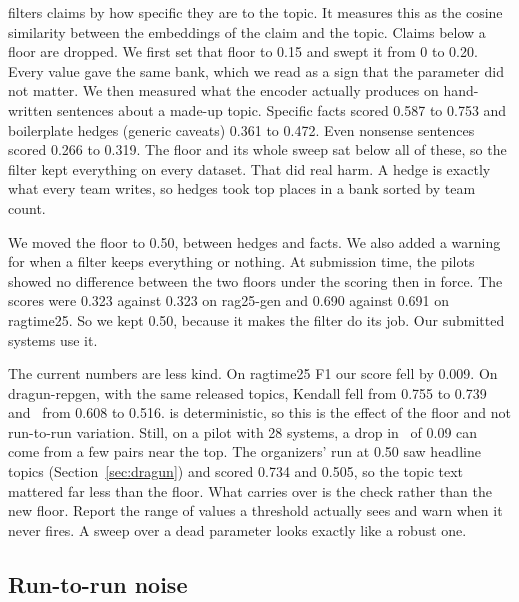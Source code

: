  filters claims by how specific they are to the topic. It
measures this as the cosine similarity between the embeddings of the claim and the
topic. Claims below a floor are dropped. We first set that floor to 0.15 and swept
it from 0 to 0.20. Every value gave the same bank, which we read as a sign that the
parameter did not matter. We then measured what the encoder actually produces on
hand-written sentences about a made-up topic. Specific facts scored 0.587 to 0.753
and boilerplate hedges (generic caveats) 0.361 to 0.472. Even nonsense sentences
scored 0.266 to 0.319. The floor and its whole sweep sat below all of these, so the
filter kept everything on every dataset. That did real harm. A hedge is exactly
what every team writes, so hedges took top places in a bank sorted by team count.

We moved the floor to 0.50, between hedges and facts. We also added a warning for
when a filter keeps everything or nothing. At submission time, the pilots showed no
difference between the two floors under the scoring then in force. The scores were
0.323 against 0.323 on rag25-gen and 0.690 against 0.691 on ragtime25. So we kept
0.50, because it makes the filter do its job. Our submitted 
systems use it.

The current numbers are less kind. On ragtime25 F1 our score fell by 0.009. On
dragun-repgen, with the same released topics, Kendall fell from 0.755 to 0.739 and
\tauap\ from 0.608 to 0.516.  is deterministic, so this is the
effect of the floor and not run-to-run variation. Still, on a pilot with 28
systems, a drop in \tauap\ of 0.09 can come from a few pairs near the top. The
organizers' run at 0.50 saw headline topics (Section~\ref{sec:dragun}) and scored
0.734 and 0.505, so the topic text mattered far less than the floor. What carries
over is the check rather than the new floor. Report the range of values a
threshold actually sees and warn when it never fires. A sweep over a dead
parameter looks exactly like a robust one.

\subsection{Run-to-run noise}
\label{sec:noise}

